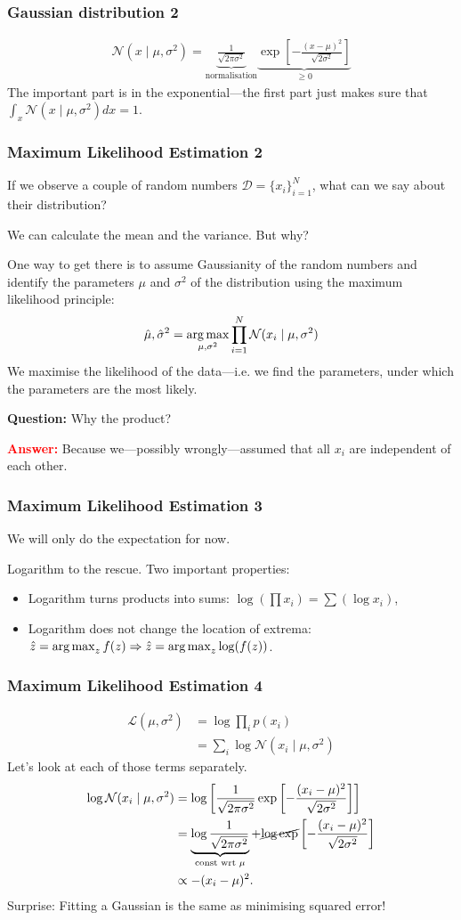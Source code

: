 \documentclass[USenglish,pdftex,compress,10pt,svgnamesi,handout]{beamer}
\newcommand{\eq}[1]{\begin{align*}#1\end{align*}}
\newcommand{\question}[1]{\par{\textbf{Question:}} #1}
\newcommand{\answer}[1]{\par{\textcolor{red}{\textbf{Answer:}}} #1}
\begin{document}
\begin{frame}
\frametitle{Gaussian distribution 2}
\eq{
    \mathcal{N}(x\mid \mu, \sigma^2) =
        \underbrace{\frac{1}{\sqrt{2\pi\sigma^2}}}_{\text{normalisation}}
        \underbrace{\exp \left [-\frac{(x - \mu)^2}{\sqrt{2\sigma^2}} \right ]}_{\ge 0}
}
The important part is in the exponential---the first part just makes sure that $\int_x \mathcal{N}(x\mid \mu, \sigma^2) dx = 1$.

\end{frame}


\begin{frame}
\frametitle{Maximum Likelihood Estimation 2}
If we observe a couple of random numbers $\mathcal{D} = \{x_i\}_{i=1}^N$, what can we say about their distribution?

We can calculate the mean and the variance. But why?

One way to get there is to assume Gaussianity of the random numbers and identify the parameters $\mu$ and $\sigma^2$ of the distribution using the maximum likelihood principle:
\eq{
    \hat{\mu}, \hat{\sigma}^2 = \argmax_{\mu, \sigma^2} \prod_{i=1}^N \mathcal{N}(x_i\mid \mu, \sigma^2)
}
We maximise the likelihood of the data---i.e. we find the parameters, under which the parameters are the most likely.

\pause
\question{Why the product?}
\pause
\answer{Because we---possibly wrongly---assumed that all $x_i$ are independent of each other.}

\end{frame}

\begin{frame}
\frametitle{Maximum Likelihood Estimation 3}
We will only do the expectation for now.

Logarithm to the rescue. Two important properties:
\begin{itemize}
    \item Logarithm turns products into sums: $\log(\prod x_i) = \sum(\log x_i)$,
    \item Logarithm does not change the location of extrema: $\hat{z} = \operatorname*{arg\,max}_z f(z) \Rightarrow \hat{z} = \operatorname*{arg\,max}_z \log(f(z))$.
\end{itemize}
\end{frame}


\begin{frame}
\frametitle{Maximum Likelihood Estimation 4}
\eq{
    \mathcal{L}(\mu, \sigma^2)
        &= \log \prod_i p(x_i) \\
        &= \sum_i \log \mathcal{N}(x_i\mid \mu, \sigma^2)
}
\pause
Let's look at each of those terms separately.
\eq{
    \log \mathcal{N}(x_i\mid \mu, \sigma^2) 
        &= \log \left [
           \frac{1}{\sqrt{2\pi\sigma^2}}
           \exp \left [-\frac{(x_i - \mu)^2}{\sqrt{2\sigma^2}} \right ] 
           \right ]\\
        &= 
            \underbrace{\log \frac{1}{\sqrt{2\pi\sigma^2}}}_{\text{const wrt }\mu}
           + \cancel{\log \exp} \left [-\frac{(x_i - \mu)^2}{\sqrt{2\sigma^2}} \right ] \\
        &\propto -(x_i - \mu)^2.
}
\pause
Surprise: Fitting a Gaussian is the same as minimising squared error!
\end{frame}
\end{document}
